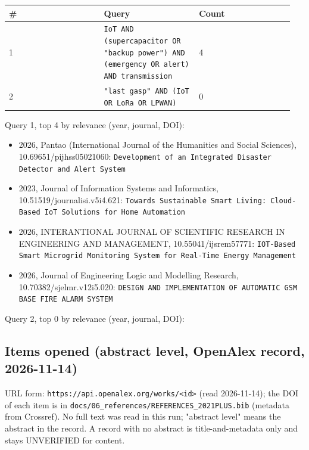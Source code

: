 {\scriptsize\raggedright
\begin{longtable}{p{0.317\linewidth}p{0.317\linewidth}p{0.317\linewidth}}
\toprule
\# & Query & Count \\
\midrule
\endhead
1 & \texttt{IoT AND (supercapacitor OR "backup power") AND (emergency OR alert) AND transmission} & 4 \\
2 & \texttt{"last gasp" AND (IoT OR LoRa OR LPWAN)} & 0 \\
\bottomrule
\end{longtable}}

Query 1, top 4 by relevance (year, journal, DOI):

\begin{itemize}
\item 2026, Pantao (International Journal of the Humanities and Social Sciences), 10.69651/pijhss05021060: \texttt{Development of an Integrated Disaster Detector and Alert System}
\item 2023, Journal of Information Systems and Informatics, 10.51519/journalisi.v5i4.621: \texttt{Towards Sustainable Smart Living: Cloud-Based IoT Solutions for Home Automation}
\item 2026, INTERANTIONAL JOURNAL OF SCIENTIFIC RESEARCH IN ENGINEERING AND MANAGEMENT, 10.55041/ijsrem57771: \texttt{IOT-Based Smart Microgrid Monitoring System for Real-Time Energy Management}
\item 2026, Journal of Engineering Logic and Modelling Research, 10.70382/sjelmr.v12i5.020: \texttt{DESIGN AND IMPLEMENTATION OF AUTOMATIC GSM BASE FIRE ALARM SYSTEM}
\end{itemize}

Query 2, top 0 by relevance (year, journal, DOI):


\subsection*{Items opened (abstract level, OpenAlex record, 2026-11-14)}

URL form: \texttt{https://api.openalex.org/works/<id>} (read 2026-11-14); the DOI of each item is in \texttt{docs/06\_references/REFERENCES\_2021PLUS.bib} (metadata from Crossref). No full text was read in this run; "abstract level" means the abstract in the record. A record with no abstract is title-and-metadata only and stays UNVERIFIED for content.

